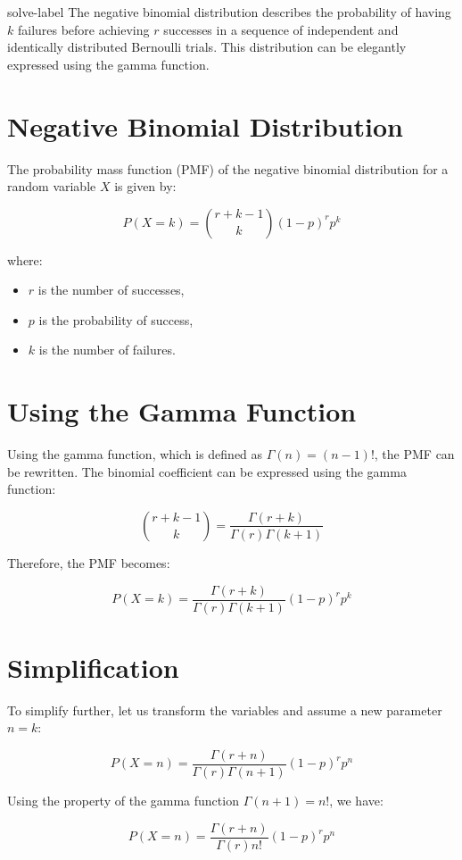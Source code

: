 	\begin{solve}{}{solve-label}
The negative binomial distribution describes the probability of having \(k\) failures before achieving \(r\) successes in a sequence of independent and identically distributed Bernoulli trials. This distribution can be elegantly expressed using the gamma function.

\section*{Negative Binomial Distribution}

The probability mass function (PMF) of the negative binomial distribution for a random variable \(X\) is given by:

\[
P(X = k) = \binom{r+k-1}{k} (1-p)^r p^k
\]

where:
\begin{itemize}
	\item \(r\) is the number of successes,
	\item \(p\) is the probability of success,
	\item \(k\) is the number of failures.
\end{itemize}

\section*{Using the Gamma Function}

Using the gamma function, which is defined as \(\Gamma(n) = (n-1)!\), the PMF can be rewritten. The binomial coefficient can be expressed using the gamma function:

\[
\binom{r+k-1}{k} = \frac{\Gamma(r+k)}{\Gamma(r) \Gamma(k+1)}
\]

Therefore, the PMF becomes:

\[
P(X = k) = \frac{\Gamma(r+k)}{\Gamma(r) \Gamma(k+1)} (1-p)^r p^k
\]

\section*{Simplification}

To simplify further, let us transform the variables and assume a new parameter \(n = k\):

\[
P(X = n) = \frac{\Gamma(r+n)}{\Gamma(r) \Gamma(n+1)} (1-p)^r p^n
\]

Using the property of the gamma function \(\Gamma(n+1) = n!\), we have:

\[
P(X = n) = \frac{\Gamma(r+n)}{\Gamma(r) n!} (1-p)^r p^n
\]


\end{solve}
